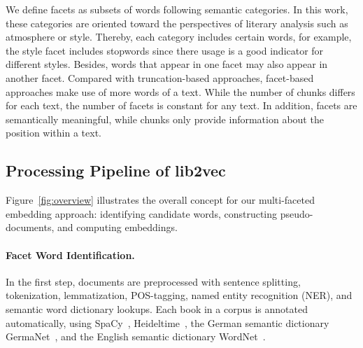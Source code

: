 \documentclass[11pt]{article}
\begin{document}
We define facets as subsets of words following semantic categories.
In this work, these categories are oriented toward the perspectives of literary analysis such as atmosphere or style.
Thereby, each category includes certain words, for example, the style facet includes stopwords since there usage is a good indicator for different styles.
Besides, words that appear in one facet may also appear in another facet.
Compared with truncation-based approaches, facet-based approaches make use of more words of a text.
While the number of chunks differs for each text, the number of facets is constant for any text.
In addition, facets are semantically meaningful, while chunks only provide information about the position within a text.

\subsection{Processing Pipeline of lib2vec}

Figure~\ref{fig:overview} illustrates the overall concept for our multi-faceted embedding approach: identifying candidate words, constructing pseudo-documents, and computing embeddings.

\paragraph{Facet Word Identification.}
In the first step, documents are preprocessed with sentence splitting, tokenization, lemmatization, POS-tagging, named entity recognition (NER), and semantic word dictionary lookups.
Each book in a corpus is annotated automatically, using SpaCy~\citep{honnibal2020spacy}, Heideltime~\citep{stroetgenmultilingual2013}, the German semantic dictionary GermaNet~\citep{hamp1997germanet, henrich2010gernedit}, and the English semantic dictionary WordNet~\citep{fellbaum2010wordnet}.
\end{document}
